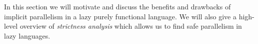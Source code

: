 In this section we will motivate and discuss the benefits and drawbacks of
implicit parallelism in a lazy purely functional language. We will also give
a high-level overview of \emph{strictness analysis} which allows us to find safe
parallelism in lazy languages.

